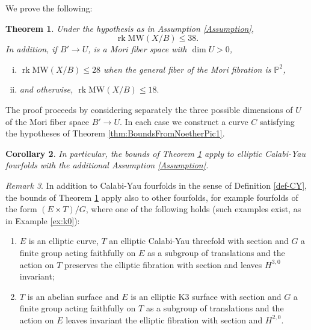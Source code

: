 \documentclass[11pt]{amsart}
\newtheorem{theorem}{Theorem}[section]
\newtheorem{corollary}[theorem]{Corollary}
\theoremstyle{definition}
\theoremstyle{definition}
\theoremstyle{remark}
\newtheorem{remark}[theorem]{Remark}
\theoremstyle{remark}
\theoremstyle{definition}
\theoremstyle{conjecture}
\newcommand{\MW}{\mathrm{MW}}
\begin{document}
 
 We prove the following:
 \begin{theorem}\label{thm-4foldgen} 
 Under the hypothesis as in Assumption \ref{Assumption},
      \[\operatorname{rk} \MW(X/B)  \leq  38. \]
      In addition, if $B' \to U$,  is a  Mori fiber space with  $\dim U >0$, 
      \begin{enumerate}[(i)]
          \item $\operatorname{rk} \MW(X/B)  \leq  28 $  when the general fiber  of the Mori fibration is $\mathbb{P}^2$,
          \item   and otherwise,
$\operatorname{rk} \MW(X/B)  \leq  18. $
      \end{enumerate}

 \end{theorem}


The proof proceeds by considering separately the three possible dimensions of  $U$ of the Mori fiber space $B' \to U$. In each case we construct a curve $C$ satisfying the hypotheses of Theorem \ref{thm:BoundsFromNoetherPic1}.


\begin{corollary}\label{cor:CY4bounds}
In particular, the bounds of Theorem \ref{thm-4foldgen}  apply to elliptic Calabi-Yau fourfolds with the additional Assumption \ref{Assumption}.
\end{corollary}

\begin{remark}\label{remark:BDS4}
In addition to Calabi-Yau fourfolds in the sense of Definition \ref{def-CY}, the bounds of Theorem \ref{thm-4foldgen} apply also to other fourfolds, for example fourfolds  of the form $(E \times T)/G$, where one of the following holds (such examples exist, as in Example  \ref{ex:k0}):
\begin{enumerate}
\item 
$E$ is an elliptic curve, $T$ an elliptic Calabi-Yau threefold  with section and $G$ a finite group acting faithfully on $E$ as a subgroup of translations and the action on $T$ preserves the elliptic fibration  with  section and leaves $H^{3,0}$ invariant;
\item 
$T$ is an abelian surface and $E$ is an elliptic K3 surface  with section and $G$ a finite group acting faithfully on $T$ as a subgroup of translations and the action on $E$ leaves invariant the elliptic fibration with  section and  $H^{2,0}$.
\end{enumerate}


\end{remark}
\end{document}
